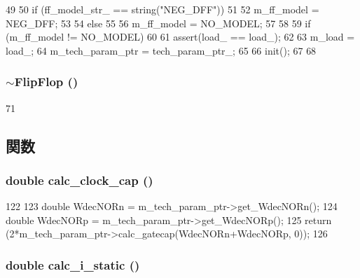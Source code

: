 \begin{DoxyCode}
49 {
50     if (ff_model_str_ == string("NEG_DFF"))
51     {
52         m_ff_model = NEG_DFF;
53     }
54     else
55     {
56         m_ff_model = NO_MODEL;
57     }
58 
59     if (m_ff_model != NO_MODEL)
60     {
61         assert(load_ == load_);
62 
63         m_load = load_;
64         m_tech_param_ptr = tech_param_ptr_;
65 
66         init();
67     }
68 }
\end{DoxyCode}
\hypertarget{classFlipFlop_a5ad30637ad1ea867d4d0de77a909301a}{
\subsubsection[{$\sim$FlipFlop}]{\setlength{\rightskip}{0pt plus 5cm}$\sim${\bf FlipFlop} ()}}
\label{classFlipFlop_a5ad30637ad1ea867d4d0de77a909301a}



\begin{DoxyCode}
71 {}
\end{DoxyCode}


\subsection{関数}
\hypertarget{classFlipFlop_a379c4230af4ae12ec9291245a2254ea9}{
\subsubsection[{calc\_\-clock\_\-cap}]{\setlength{\rightskip}{0pt plus 5cm}double calc\_\-clock\_\-cap ()}}
\label{classFlipFlop_a379c4230af4ae12ec9291245a2254ea9}



\begin{DoxyCode}
122 {
123     double WdecNORn = m_tech_param_ptr->get_WdecNORn();
124     double WdecNORp = m_tech_param_ptr->get_WdecNORp();
125     return (2*m_tech_param_ptr->calc_gatecap(WdecNORn+WdecNORp, 0));
126 }
\end{DoxyCode}
\hypertarget{classFlipFlop_a0027807356ac4ca07fe2e593234eb884}{
\subsubsection[{calc\_\-i\_\-static}]{\setlength{\rightskip}{0pt plus 5cm}double calc\_\-i\_\-static ()}}
\label{classFlipFlop_a0027807356ac4ca07fe2e593234eb884}



